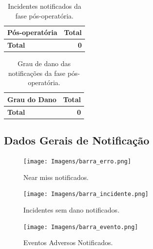 \documentclass[
  a4paper]{article}
\begin{document}
\begin{table}[H]

\caption{\label{tab:unnamed-chunk-18}Incidentes notificados da fase pós-operatória.}
\centering
\begin{tabular}[t]{lr}
\toprule
Pós-operatória & Total\\
\midrule
\midrule
\textbf{Total} & \textbf{0}\\
\bottomrule
\end{tabular}
\end{table}

\begin{table}[H]

\caption{\label{tab:unnamed-chunk-19}Grau de dano das notificações da fase pós-operatória.}
\centering
\begin{tabular}[t]{lr}
\toprule
Grau do Dano & Total\\
\midrule
\midrule
\textbf{Total} & \textbf{0}\\
\bottomrule
\end{tabular}
\end{table}

\subsection{Dados Gerais de Notificação}

\begin{figure}[H]
\caption{Near miss notificados.}
\texttt{[image: Imagens/barra\_erro.png]}
\end{figure}

\begin{figure}[H]
\caption{Incidentes sem dano notificados.}
\texttt{[image: Imagens/barra\_incidente.png]}
\end{figure}

\begin{figure}[H]
\caption{Eventos Adversos Notificados.}
\texttt{[image: Imagens/barra\_evento.png]}
\end{figure}
\end{document}
